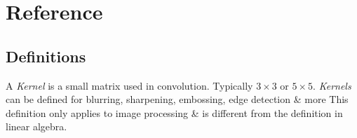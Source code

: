 \documentclass[11pt,a4paper]{article}
\begin{document}
\newpage
\setcounter{section}{-1}

\section{Reference}

\subsection{Definitions}

A \textit{Kernel} is a small matrix used in convolution. Typically $3\times3$ or $5\times5$. \textit{Kernels} can be defined for blurring, sharpening, embossing, edge detection \& more
\nb This definition only applies to image processing \& is different from the definition in linear algebra.
\end{document}
